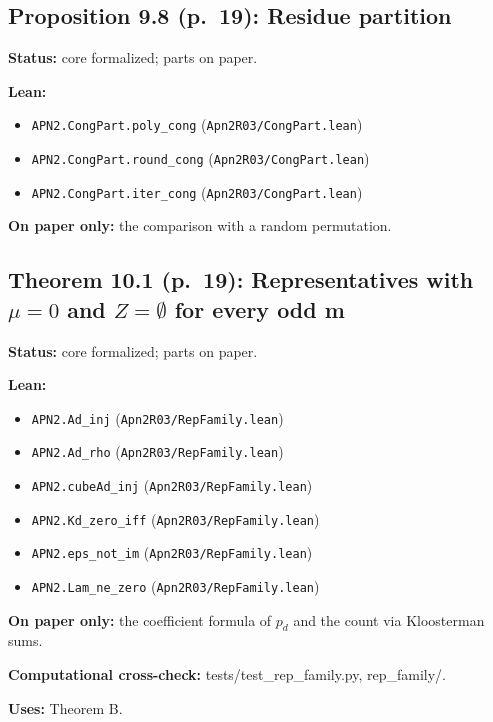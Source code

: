 \documentclass[11pt]{article}
\begin{document}
\subsection*{Proposition 9.8 (p.~19): Residue partition}
\textbf{Status:} core formalized; parts on paper.\par
\textbf{Lean:}\begin{itemize}\setlength\itemsep{0pt}
\item \texttt{APN2.CongPart.poly\_cong} \hfill (\texttt{Apn2R03/CongPart.lean})
\item \texttt{APN2.CongPart.round\_cong} \hfill (\texttt{Apn2R03/CongPart.lean})
\item \texttt{APN2.CongPart.iter\_cong} \hfill (\texttt{Apn2R03/CongPart.lean})
\end{itemize}
\textbf{On paper only:} the comparison with a random permutation.\par
\subsection*{Theorem 10.1 (p.~19): Representatives with $\mu=0$ and $Z=\emptyset$ for every odd m}
\textbf{Status:} core formalized; parts on paper.\par
\textbf{Lean:}\begin{itemize}\setlength\itemsep{0pt}
\item \texttt{APN2.Ad\_inj} \hfill (\texttt{Apn2R03/RepFamily.lean})
\item \texttt{APN2.Ad\_rho} \hfill (\texttt{Apn2R03/RepFamily.lean})
\item \texttt{APN2.cubeAd\_inj} \hfill (\texttt{Apn2R03/RepFamily.lean})
\item \texttt{APN2.Kd\_zero\_iff} \hfill (\texttt{Apn2R03/RepFamily.lean})
\item \texttt{APN2.eps\_not\_im} \hfill (\texttt{Apn2R03/RepFamily.lean})
\item \texttt{APN2.Lam\_ne\_zero} \hfill (\texttt{Apn2R03/RepFamily.lean})
\end{itemize}
\textbf{On paper only:} the coefficient formula of $p_d$ and the count via Kloosterman sums.\par
\textbf{Computational cross-check:} tests/test\_rep\_family.py, rep\_family/.\par
\textbf{Uses:} Theorem B.\par
\end{document}
